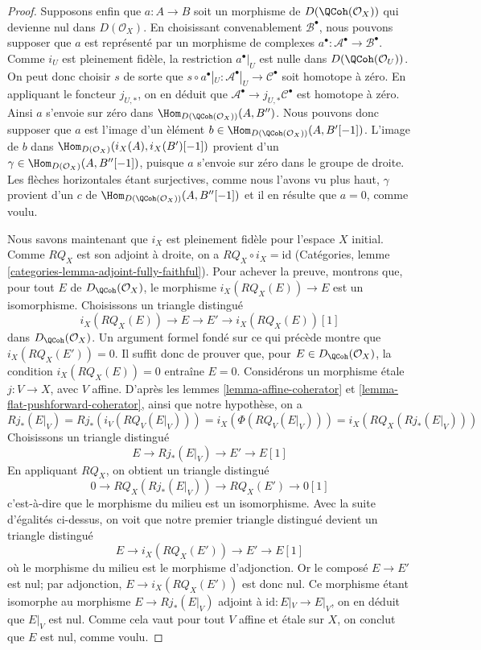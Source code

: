 \begin{proof}
Supposons enfin que $a : A \to B$ soit un morphisme de
$D(\QCoh(\mathcal{O}_X))$ qui devienne nul dans $D(\mathcal{O}_X)$. En
choisissant convenablement $\mathcal{B}^\bullet$, nous pouvons supposer que
$a$ est repr\'esent\'e par un morphisme de complexes
$a^\bullet : \mathcal{A}^\bullet \to \mathcal{B}^\bullet$. Comme $i_U$ est
pleinement fid\`ele, la restriction $a^\bullet|_U$ est nulle dans
$D(\QCoh(\mathcal{O}_U))$. On peut donc choisir $s$ de sorte que
$s \circ a^\bullet|_U : \mathcal{A}^\bullet|_U \to \mathcal{C}^\bullet$
soit homotope \`a z\'ero. En appliquant le foncteur $j_{U, *}$, on en d\'eduit
que $\mathcal{A}^\bullet \to j_{U, *}\mathcal{C}^\bullet$ est homotope \`a
z\'ero. Ainsi $a$ s'envoie sur z\'ero dans
$\Hom_{D(\QCoh(\mathcal{O}_X))}(A, B'')$.
Nous pouvons donc supposer que $a$ est l'image d'un \`el\'ement
$b \in \Hom_{D(\QCoh(\mathcal{O}_X))}(A, B'[-1])$. L'image de $b$ dans
$\Hom_{D(\mathcal{O}_X)}(i_X(A), i_X(B')[-1])$ provient d'un
$\gamma \in \Hom_{D(\mathcal{O}_X)}(A, B''[-1])$, puisque $a$ s'envoie sur
z\'ero dans le groupe de droite. Les fl\`eches horizontales \'etant
surjectives, comme nous l'avons vu plus haut, $\gamma$ provient d'un
$c$ de
$\Hom_{D(\QCoh(\mathcal{O}_X))}(A, B''[-1])$
et il en r\'esulte que $a = 0$, comme voulu.

\medskip\noindent
Nous savons maintenant que $i_X$ est pleinement fid\`ele pour l'espace $X$
initial. Comme $RQ_X$ est son adjoint \`a droite, on a
$RQ_X \circ i_X = \text{id}$ (Cat\'egories, lemme
\ref{categories-lemma-adjoint-fully-faithful}).
Pour achever la preuve, montrons que, pour tout
$E$ de $D_\QCoh(\mathcal{O}_X)$, le morphisme
$i_X(RQ_X(E)) \to E$ est un isomorphisme. Choisissons un triangle distingu\'e
$$
i_X(RQ_X(E)) \to E \to E' \to i_X(RQ_X(E))[1]
$$
dans $D_\QCoh(\mathcal{O}_X)$. Un argument formel fond\'e sur ce qui pr\'ec\`ede
montre que $i_X(RQ_X(E')) = 0$. Il suffit donc de prouver que, pour
$E \in D_\QCoh(\mathcal{O}_X)$, la condition $i_X(RQ_X(E)) = 0$ entra\^ine
$E = 0$. Consid\'erons un morphisme \'etale $j : V \to X$, avec $V$ affine.
D'apr\`es les lemmes \ref{lemma-affine-coherator} et
\ref{lemma-flat-pushforward-coherator}, ainsi que notre hypoth\`ese, on a
$$
Rj_*(E|_V) = Rj_*(i_V(RQ_V(E|_V))) = i_X(\Phi(RQ_V(E|_V))) =
i_X(RQ_X(Rj_*(E|_V)))
$$
Choisissons un triangle distingu\'e
$$
E \to Rj_*(E|_V) \to E' \to E[1]
$$
En appliquant $RQ_X$, on obtient un triangle distingu\'e
$$
0 \to RQ_X(Rj_*(E|_V)) \to RQ_X(E') \to 0[1]
$$
c'est-\`a-dire que le morphisme du milieu est un isomorphisme. Avec la suite
d'\'egalit\'es ci-dessus, on voit que notre premier triangle distingu\'e devient
un triangle distingu\'e
$$
E \to i_X(RQ_X(E')) \to E' \to E[1]
$$
o\`u le morphisme du milieu est le morphisme d'adjonction. Or le compos\'e
$E \to E'$ est nul; par adjonction, $E \to i_X(RQ_X(E'))$ est donc nul.
Ce morphisme \'etant isomorphe au morphisme
$E \to Rj_*(E|_V)$ adjoint \`a $\text{id} : E|_V \to E|_V$, on en d\'eduit
que $E|_V$ est nul. Comme cela vaut pour tout $V$ affine et \'etale sur $X$,
on conclut que $E$ est nul, comme voulu.
\end{proof}

